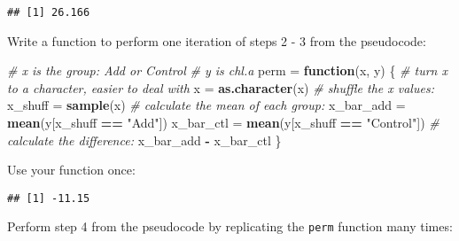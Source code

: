\documentclass[]{book}
\newenvironment{Shaded}{\begin{snugshade}}{\end{snugshade}}
\newcommand{\KeywordTok}[1]{\textcolor[rgb]{0.13,0.29,0.53}{\textbf{#1}}}
\newcommand{\DataTypeTok}[1]{\textcolor[rgb]{0.13,0.29,0.53}{#1}}
\newcommand{\DecValTok}[1]{\textcolor[rgb]{0.00,0.00,0.81}{#1}}
\newcommand{\StringTok}[1]{\textcolor[rgb]{0.31,0.60,0.02}{#1}}
\newcommand{\CommentTok}[1]{\textcolor[rgb]{0.56,0.35,0.01}{\textit{#1}}}
\newcommand{\ControlFlowTok}[1]{\textcolor[rgb]{0.13,0.29,0.53}{\textbf{#1}}}
\newcommand{\OperatorTok}[1]{\textcolor[rgb]{0.81,0.36,0.00}{\textbf{#1}}}
\newcommand{\NormalTok}[1]{#1}
\theoremstyle{definition}
\theoremstyle{definition}
\theoremstyle{definition}
\theoremstyle{remark}
\begin{document}
\begin{verbatim}
## [1] 26.166
\end{verbatim}

Write a function to perform one iteration of steps 2 - 3 from the
pseudocode:

\begin{Shaded}
\begin{Highlighting}[]
\CommentTok{# x is the group: Add or Control}
\CommentTok{# y is chl.a}
\NormalTok{perm =}\StringTok{ }\ControlFlowTok{function}\NormalTok{(x, y) \{}
  \CommentTok{# turn x to a character, easier to deal with}
\NormalTok{  x =}\StringTok{ }\KeywordTok{as.character}\NormalTok{(x)}
  \CommentTok{# shuffle the x values:}
\NormalTok{  x_shuff =}\StringTok{ }\KeywordTok{sample}\NormalTok{(x)}
  \CommentTok{# calculate the mean of each group:}
\NormalTok{  x_bar_add =}\StringTok{ }\KeywordTok{mean}\NormalTok{(y[x_shuff }\OperatorTok{==}\StringTok{ "Add"}\NormalTok{])}
\NormalTok{  x_bar_ctl =}\StringTok{ }\KeywordTok{mean}\NormalTok{(y[x_shuff }\OperatorTok{==}\StringTok{ "Control"}\NormalTok{])}
  \CommentTok{# calculate the difference:}
\NormalTok{  x_bar_add }\OperatorTok{-}\StringTok{ }\NormalTok{x_bar_ctl}
\NormalTok{\}}
\end{Highlighting}
\end{Shaded}

Use your function once:

\begin{Shaded}
\end{Shaded}

\begin{verbatim}
## [1] -11.15
\end{verbatim}

Perform step 4 from the pseudocode by replicating the \texttt{perm}
function many times:

\begin{Shaded}
\end{Shaded}
\end{document}
